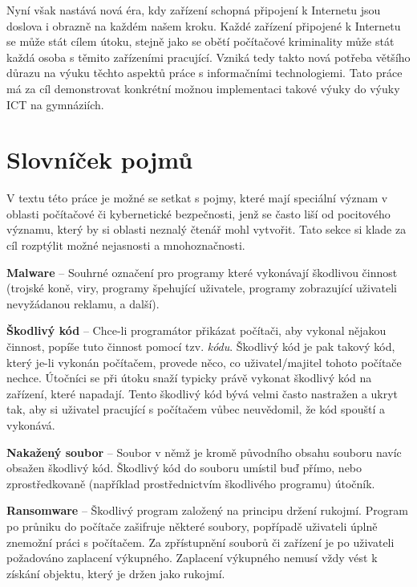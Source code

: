 \documentclass[a4paper, 12pt]{article}
\begin{document}
Nyní však nastává nová éra, kdy zařízení schopná připojení k Internetu jsou doslova i obrazně na každém našem kroku. Každé zařízení připojené k Internetu se může stát cílem útoku, stejně jako se obětí počítačové kriminality může stát každá osoba s těmito zařízeními pracující. Vzniká tedy takto nová potřeba většího důrazu na výuku těchto aspektů práce s informačními technologiemi. Tato práce má za cíl demonstrovat konkrétní možnou implementaci takové výuky do výuky ICT na gymnáziích.

\newpage
\section{Slovníček pojmů}
V textu této práce je možné se setkat s pojmy, které mají speciální význam v oblasti počítačové či kybernetické bezpečnosti, jenž se často liší od pocitového významu, který by si oblasti neznalý čtenář mohl vytvořit. Tato sekce si klade za cíl rozptýlit možné nejasnosti a mnohoznačnosti.

\textbf{Malware} -- Souhrné označení pro programy které vykonávají škodlivou činnost (trojské koně, viry, programy špehující uživatele, programy zobrazující uživateli nevyžádanou reklamu, a další).

\textbf{Škodlivý kód} -- Chce-li programátor přikázat počítači, aby vykonal nějakou činnost, popíše tuto činnost pomocí tzv. \textit{kódu}. Škodlivý kód je pak takový kód, který je-li vykonán počítačem, provede něco, co uživatel/majitel tohoto počítače nechce. Útočníci se při útoku snaží typicky právě vykonat škodlivý kód na zařízení, které napadají. Tento škodlivý kód bývá velmi často nastražen a ukryt tak, aby si uživatel pracující s počítačem vůbec neuvědomil, že kód spouští a vykonává.

\textbf{Nakažený soubor} -- Soubor v němž je kromě původního obsahu souboru navíc obsažen škodlivý kód. Škodlivý kód do souboru umístil buď přímo, nebo zprostředkovaně (například prostřednictvím škodlivého programu) útočník.

\textbf{Ransomware} -- Škodlivý program založený na principu držení rukojmí. Program po průniku do počítače zašifruje některé soubory, popřípadě uživateli úplně znemožní práci s počítačem. Za zpřístupnění souborů či zařízení je po uživateli požadováno zaplacení výkupného. Zaplacení výkupného nemusí vždy vést k získání objektu, který je držen jako rukojmí.
\end{document}
